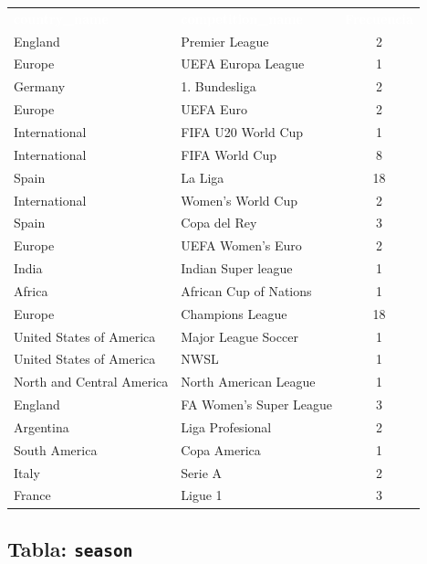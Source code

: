 \documentclass[12pt,a4paper]{article}
\newcommand{\thead}[1]{%
  \cellcolor{tableheader}\textcolor{white}{\textbf{#1}}%
}
\begin{document}
\begin{center}
\small
\begin{tabular}{llc}
\rowcolor{tableheader} 
\thead{country\_name} & \thead{competition\_name} & \thead{Frecuencia} \\

\rowcolor{tablealt} England & Premier League & 2 \\
\rowcolor{tablerow} Europe & UEFA Europa League & 1 \\
\rowcolor{tablealt} Germany & 1. Bundesliga & 2 \\
\rowcolor{tablerow} Europe & UEFA Euro & 2 \\
\rowcolor{tablealt} International & FIFA U20 World Cup & 1 \\
\rowcolor{tablerow} International & FIFA World Cup & 8 \\
\rowcolor{tablealt} Spain & La Liga & 18 \\
\rowcolor{tablerow} International & Women's World Cup & 2 \\
\rowcolor{tablealt} Spain & Copa del Rey & 3 \\
\rowcolor{tablerow} Europe & UEFA Women's Euro & 2 \\
\rowcolor{tablealt} India & Indian Super league & 1 \\
\rowcolor{tablerow} Africa & African Cup of Nations & 1 \\
\rowcolor{tablealt} Europe & Champions League & 18 \\
\rowcolor{tablerow} United States of America & Major League Soccer & 1 \\
\rowcolor{tablealt} United States of America & NWSL & 1 \\
\rowcolor{tablerow} North and Central America & North American League & 1 \\
\rowcolor{tablealt} England & FA Women's Super League & 3 \\
\rowcolor{tablerow} Argentina & Liga Profesional & 2 \\
\rowcolor{tablealt} South America & Copa America & 1 \\
\rowcolor{tablerow} Italy & Serie A & 2 \\
\rowcolor{tablealt} France & Ligue 1 & 3 \\

\end{tabular}
\end{center}

\subsection{Tabla: \texttt{season}}
\end{document}
